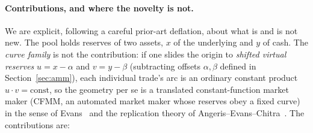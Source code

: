 \documentclass[runningheads]{llncs}
\begin{document}
\paragraph{Contributions, and where the novelty is not.}
We are explicit, following a careful prior-art deflation, about what is and is
not new. The pool holds reserves of two assets, $x$ of the underlying and $y$ of
cash. The \emph{curve family} is not the contribution: if one slides the origin to
\emph{shifted virtual reserves} $u=x-\alpha$ and $v=y-\beta$ (subtracting offsets
$\alpha,\beta$ defined in Section~\ref{sec:amm}), each individual trade's arc is an
ordinary constant product $u\cdot v=\text{const}$, so the geometry per se is a
translated constant-function market maker (CFMM, an automated market maker whose
reserves obey a fixed curve) in the sense of Evans~\cite{evans2020} and the
replication theory of Angeris--Evans--Chitra~\cite{angeris-replicating}. The
contributions are:
\end{document}
